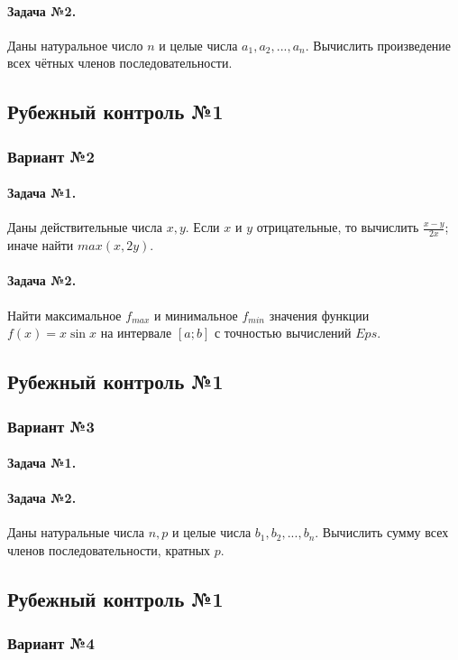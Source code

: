 \documentclass[12pt,a4paper]{report}
\begin{document}
\paragraph*{Задача №2.} Даны натуральное число $n$ и целые числа $a_1, a_2, ..., a_n$. Вычислить произведение всех чётных членов последовательности.

\subsection*{Рубежный контроль №1}
\subsubsection*{Вариант №2}
\paragraph*{Задача №1.} Даны действительные числа $x, y$. Если $x$ и $y$ отрицательные, то вычислить $\frac {x-y} {2x}$; иначе найти $max(x, 2y)$.
\paragraph*{Задача №2.} Найти максимальное $f_{max}$ и минимальное $f_{min}$ значения функции $f(x)=x \sin x$ на интервале $[a; b]$ с точностью вычислений $Eps$.

\subsection*{Рубежный контроль №1}
\subsubsection*{Вариант №3}
\paragraph*{Задача №1.} 
\paragraph*{Задача №2.} Даны натуральные числа $n, p$ и целые числа $b_1, b_2, ..., b_n$. Вычислить сумму всех членов последовательности, кратных $p$.

\subsection*{Рубежный контроль №1}
\subsubsection*{Вариант №4}
\end{document}
